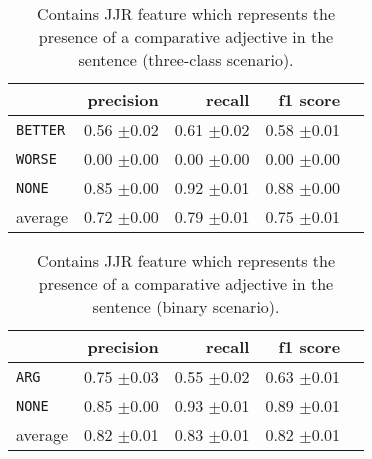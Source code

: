 	
	\begin{table}[htbp] 
		\centering 
		\caption{Contains JJR feature which represents the presence of a comparative adjective in the sentence (three-class scenario).} 

		\begin{tabular}{@{}lrrrr@{}}
			\toprule
			        & precision                & recall                   & f1 score                 \\ \midrule 
\texttt	{BETTER}	&	 0.56 \scriptsize{$\pm$0.02} &	 0.61 \scriptsize{$\pm$0.02} &	 0.58 \scriptsize{$\pm$0.01}  \\ 
\texttt	{WORSE}	&	 0.00 \scriptsize{$\pm$0.00} &	 0.00 \scriptsize{$\pm$0.00} &	 0.00 \scriptsize{$\pm$0.00}  \\ 
\texttt	{NONE}	&	 0.85 \scriptsize{$\pm$0.00} &	 0.92 \scriptsize{$\pm$0.01} &	 0.88 \scriptsize{$\pm$0.00}  \\ 
average	&	 0.72 \scriptsize{$\pm$0.00} &	 0.79 \scriptsize{$\pm$0.01} &	 0.75 \scriptsize{$\pm$0.01}  \\ 
			\bottomrule
		\end{tabular}
	\end{table}
	
		\begin{table}[htbp] 
		\centering 
		\caption{Contains JJR feature which represents the presence of a comparative adjective in the sentence (binary scenario).} 
		\label{  }
		\begin{tabular}{@{}lrrrr@{}}
			\toprule
			        & precision                & recall                   & f1 score                 \\ \midrule 
	\texttt{ARG}	&	 0.75 \scriptsize{$\pm$0.03} &	 0.55 \scriptsize{$\pm$0.02} &	 0.63 \scriptsize{$\pm$0.01}  \\ 
	\texttt{NONE}	&	 0.85 \scriptsize{$\pm$0.00} &	 0.93 \scriptsize{$\pm$0.01} &	 0.89 \scriptsize{$\pm$0.01}  \\ 
average	&	 0.82 \scriptsize{$\pm$0.01} &	 0.83 \scriptsize{$\pm$0.01} &	 0.82 \scriptsize{$\pm$0.01}  \\ 
			\bottomrule
		\end{tabular}
	\end{table}
	
